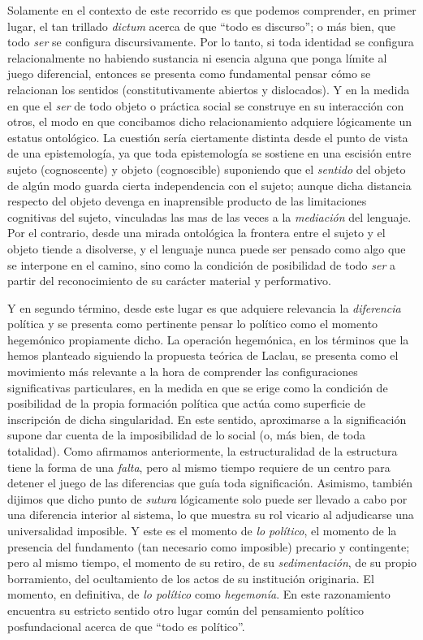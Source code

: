 Solamente en el contexto de este recorrido es que podemos comprender, en
primer lugar, el tan trillado \emph{dictum} acerca de que ``todo es
discurso''; o más bien, que todo \emph{ser} se configura
discursivamente. Por lo tanto, si toda identidad se configura
relacionalmente no habiendo sustancia ni esencia alguna que ponga límite
al juego diferencial, entonces se presenta como fundamental pensar cómo
se relacionan los sentidos (constitutivamente abiertos y dislocados). Y
en la medida en que el \emph{ser} de todo objeto o práctica social se
construye en su interacción con otros, el modo en que concibamos dicho
relacionamiento adquiere lógicamente un estatus ontológico. La cuestión
sería ciertamente distinta desde el punto de vista de una epistemología,
ya que toda epistemología se sostiene en una escisión entre sujeto
(cognoscente) y objeto (cognoscible) suponiendo que el \emph{sentido}
del objeto de algún modo guarda cierta independencia con el sujeto;
aunque dicha distancia respecto del objeto devenga en inaprensible
producto de las limitaciones cognitivas del sujeto, vinculadas las mas
de las veces a la \emph{mediación} del lenguaje. Por el contrario, desde
una mirada ontológica la frontera entre el sujeto y el objeto tiende a
disolverse, y el lenguaje nunca puede ser pensado como algo que se
interpone en el camino, sino como la condición de posibilidad de todo
\emph{ser} a partir del reconocimiento de su carácter material y
performativo.

Y en segundo término, desde este lugar es que adquiere relevancia la
\emph{diferencia} política y se presenta como pertinente pensar lo
político como el momento hegemónico propiamente dicho. La operación
hegemónica, en los términos que la hemos planteado siguiendo la
propuesta teórica de Laclau, se presenta como el movimiento más
relevante a la hora de comprender las configuraciones significativas
particulares, en la medida en que se erige como la condición de
posibilidad de la propia formación política que actúa como superficie de
inscripción de dicha singularidad. En este sentido, aproximarse a la
significación supone dar cuenta de la imposibilidad de lo social (o, más
bien, de toda totalidad). Como afirmamos anteriormente, la
estructuralidad de la estructura tiene la forma de una \emph{falta},
pero al mismo tiempo requiere de un centro para detener el juego de las
diferencias que guía toda significación. Asimismo, también dijimos que
dicho punto de \emph{sutura} lógicamente solo puede ser llevado a cabo
por una diferencia interior al sistema, lo que muestra su rol vicario al
adjudicarse una universalidad imposible. Y este es el momento de
\emph{lo político}, el momento de la presencia del fundamento (tan
necesario como imposible) precario y contingente; pero al mismo tiempo,
el momento de su retiro, de su \emph{sedimentación}, de su propio
borramiento, del ocultamiento de los actos de su institución originaria.
El momento, en definitiva, de \emph{lo político} como \emph{hegemonía}.
En este razonamiento encuentra su estricto sentido otro lugar común del
pensamiento político posfundacional acerca de que ``todo es político''.

